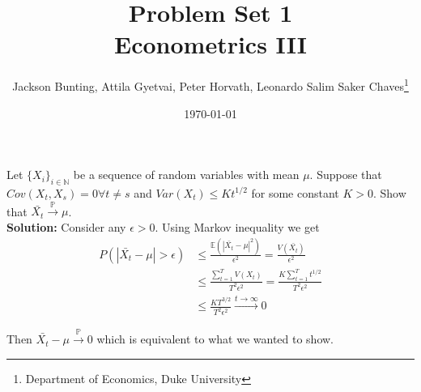 \documentclass[11pt,letterpaper]{article}                  %
\title{Problem Set 1 \\ \medskip \Large{Econometrics III}}
\author{\Large Jackson Bunting, Attila Gyetvai, Peter Horvath, Leonardo Salim Saker Chaves\footnote{Department of Economics, Duke University}}
\date{\today}
\begin{document}
\maketitle

\begin{problem}

\end{problem}

\bigskip

\begin{problem}

\end{problem}

\bigskip

\begin{problem}
Let $\{X_i\}_{i \in \mathbb{N}}$ be a sequence of random variables with mean $\mu$. Suppose that $Cov(X_t,X_s)=0 \forall t\neq s$ and $Var(X_t) \leq Kt^{1/2}$ for some constant $K>0$. Show that $\bar{X_t} \overset{\mathbb{P}}{\rightarrow} \mu$.\\

\textbf{Solution:} Consider any $\epsilon>0$. Using Markov inequality we get
\begin{align*}
P(|\bar{X_t} - \mu| > \epsilon) &\leq \frac{\mathbb{E}( |\bar{X_t} - \mu|^2)}{\epsilon^2} = \frac{V(\bar{X_t})}{\epsilon^2} \\
&\leq \frac{\sum_{t=1}^T V(X_t)}{T^2 \epsilon^2} = \frac{K \sum_{t=1}^T t^{1/2}}{T^2 \epsilon^2} \\
&\leq \frac{K T^{3/2}}{T^2 \epsilon^2} \overset{t \to \infty}{\longrightarrow} 0
\end{align*}

Then $\bar{X_t} - \mu \overset{\mathbb{P}}{\rightarrow} 0$ which is equivalent to what we wanted to show.
\end{problem}

\bigskip

\begin{problem}

\end{problem}

\bigskip
\end{document}
